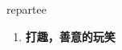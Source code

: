 
\begin{frame}
{\huge repartee}
\begin{center}
\begin{enumerate}\Large
  \item \textbf{打趣，善意的玩笑}
\end{enumerate}
\end{center}
\end{frame}

